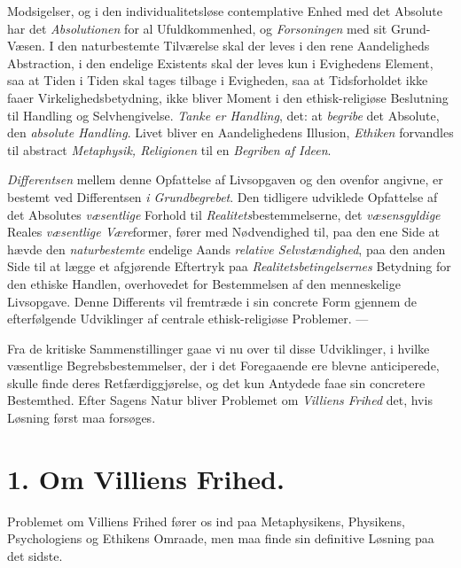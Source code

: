 Modsigelser, og i den individualitetsløse contemplative Enhed med det Absolute
har det \emph{Absolutionen} for al Ufuldkommenhed, og \emph{Forsoningen} med sit
Grund-Væsen. I den naturbestemte Tilværelse skal der leves i den rene
Aandeligheds Abstraction, i den endelige Existents skal der leves kun i
Evighedens Element, saa at Tiden i Tiden skal tages tilbage i Evigheden, saa at
Tidsforholdet ikke faaer Virkelighedsbetydning, ikke bliver Moment i den
ethisk-religiøse Beslutning til Handling og Selvhengivelse. \emph{Tanke er
Handling}, det: at \emph{begribe} det Absolute, den \emph{absolute Handling}.
Livet bliver en Aandelighedens Illusion, \emph{Ethiken} forvandles til abstract
\emph{Metaphysik, Religionen} til en \emph{Begriben af Ideen}.

\emph{Differentsen} mellem denne Opfattelse af Livsopgaven og den ovenfor
angivne, er bestemt ved Differentsen \emph{i Grundbegrebet}. Den tidligere
udviklede Opfattelse af det Absolutes \emph{væsentlige} Forhold til
\emph{Realitets}bestemmelserne, det \emph{væsensgyldige} Reales
\emph{væsentlige Være}former, fører med Nødvendighed til, paa den ene Side at
hævde den \emph{naturbestemte} endelige Aands \emph{relative Selvstændighed}, paa
den anden Side til at lægge et afgjørende Eftertryk paa
\emph{Realitetsbetingelsernes}
 Betydning for den ethiske Handlen, overhovedet for Bestemmelsen af den
menneskelige Livsopgave. Denne Differents vil fremtræde i sin concrete Form
gjennem de efterfølgende Udviklinger af centrale ethisk-religiøse Problemer. ---

Fra de kritiske Sammenstillinger gaae vi nu over til disse Udviklinger, i hvilke
væsentlige Begrebsbestemmelser, der i det Foregaaende ere blevne anticiperede,
skulle finde deres Retfærdiggjørelse, og det kun Antydede faae sin concretere
Bestemthed. Efter Sagens Natur bliver Problemet om \emph{Villiens Frihed} det,
hvis Løsning først maa forsøges.

\section*{1. Om Villiens Frihed.}

Problemet om Villiens Frihed fører os ind paa Metaphysikens, Physikens,
Psychologiens og Ethikens Omraade, men maa finde sin definitive Løsning paa det
sidste.

